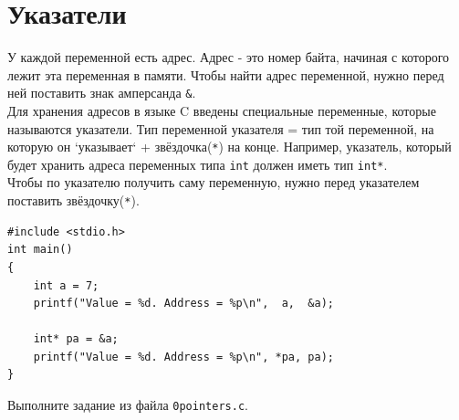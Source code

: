 \documentclass{article}
\begin{document}
\section*{Указатели}
У каждой переменной есть адрес. Адрес - это номер байта, начиная с которого лежит эта переменная в памяти. Чтобы найти адрес переменной, нужно перед ней поставить знак амперсанда \texttt{\&}. \\
Для хранения адресов в языке C введены специальные переменные, которые называются указатели. Тип переменной указателя = тип той переменной, на которую он `указывает` + звёздочка(\texttt{*}) на конце. Например, указатель, который будет хранить адреса переменных типа \texttt{int} должен иметь тип \texttt{int*}. \\
Чтобы по указателю получить саму переменную, нужно перед указателем поставить звёздочку(\texttt{*}).
\begin{lstlisting}
#include <stdio.h>
int main()
{
    int a = 7;
    printf("Value = %d. Address = %p\n",  a,  &a);
    
    int* pa = &a;
    printf("Value = %d. Address = %p\n", *pa, pa);
}
\end{lstlisting}
Выполните задание из файла \texttt{0pointers.c}.
\end{document}
